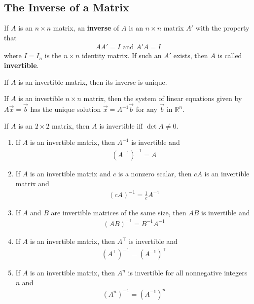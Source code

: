 \documentclass{article}
\begin{document}
\subsection{The Inverse of a Matrix}
\begin{definition}
	If $A$ is an $n\times n$ matrix, an \textbf{inverse} of $A$ is an $n\times n$ matrix $A'$ with the property that
	\begin{gather*}
		AA'=I\text{  and  } A'A = I
	\end{gather*}
	where $I = I_n$ is the $n\times n$ identity matrix. If such an $A'$ exists, then $A$ is called \textbf{invertible}.
\end{definition}
\begin{theorem}
	If $A$ is an invertible matrix, then its inverse is unique.
\end{theorem}
\begin{theorem}
	If $A$ is an invertible $n\times n$ matrix, then the system of linear equations given by $A\vec x = \vec b$ has the unique solution $\vec x = A^{-1}\vec b$ for any $\vec b$ in $\mathbb{R}^n$.
\end{theorem}
\begin{theorem}
	If $A$ is an $2\times 2$ matrix, then $A$ is invertible iff $\det A \not= 0$.
\end{theorem}
\begin{theorem}
	\begin{enumerate}
		\item If $A$ is an invertible matrix, then $A^{-1}$ is invertible and
		      \begin{gather*}
			      (A^{-1})^{-1} = A
		      \end{gather*}
		\item If $A$ is an invertible matrix and $c$ is a nonzero scalar, then $cA$ is an invertible matrix and \begin{gather*}
			      (cA)^{-1} = \frac{1}{c}A^{-1}
		      \end{gather*}
		\item If $A$ and $B$ are invertible matrices of the same size, then $AB$ is invertible and \begin{gather*}
			      (AB)^{-1} = B^{-1} A^{-1}
		      \end{gather*}
		\item If $A$ is an invertible matrix, then $A^\intercal$ is invertible and \begin{gather*}
			      (A^\intercal)^{-1}=(A^{-1})^\intercal
		      \end{gather*}
		\item If $A$ is an invertible matrix, then $A^n$ is invertible for all nonnegative integers $n$ and \begin{gather*}
			      (A^n)^{-1} = (A^{-1})^n
		      \end{gather*}
	\end{enumerate}
\end{theorem}
\end{document}
